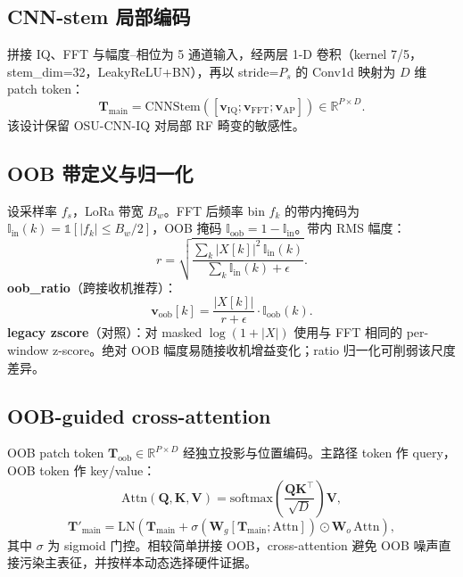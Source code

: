 \documentclass[journal]{IEEEtran}
\begin{document}
\subsection{CNN-stem 局部编码}
拼接 IQ、FFT 与幅度--相位为 5 通道输入，经两层 1-D 卷积（kernel 7/5，stem\_dim=32，LeakyReLU+BN），再以 stride=$P_s$ 的 Conv1d 映射为 $D$ 维 patch token：
\begin{equation}
  \mathbf{T}_{\mathrm{main}} = \mathrm{CNNStem}([\mathbf{v}_{\mathrm{IQ}};\mathbf{v}_{\mathrm{FFT}};\mathbf{v}_{\mathrm{AP}}]) \in \mathbb{R}^{P\times D}.
\end{equation}
该设计保留 OSU-CNN-IQ 对局部 RF 畸变的敏感性。

\subsection{OOB 带定义与归一化}
\label{sec:oob}
设采样率 $f_s$，LoRa 带宽 $B_w$。FFT 后频率 bin $f_k$ 的带内掩码为 $\mathbb{I}_{\mathrm{in}}(k)=\mathbb{1}[|f_k|\le B_w/2]$，OOB 掩码 $\mathbb{I}_{\mathrm{oob}}=1-\mathbb{I}_{\mathrm{in}}$。带内 RMS 幅度：
\begin{equation}
  r = \sqrt{\frac{\sum_k |X[k]|^2\,\mathbb{I}_{\mathrm{in}}(k)}{\sum_k \mathbb{I}_{\mathrm{in}}(k)+\epsilon}}.
\end{equation}
\textbf{oob\_ratio}（跨接收机推荐）：
\begin{equation}
  \mathbf{v}_{\mathrm{oob}}[k] = \frac{|X[k]|}{r+\epsilon}\cdot \mathbb{I}_{\mathrm{oob}}(k).
\end{equation}
\textbf{legacy zscore}（对照）：对 masked $\log(1+|X|)$ 使用与 FFT 相同的 per-window z-score。绝对 OOB 幅度易随接收机增益变化；ratio 归一化可削弱该尺度差异。

\subsection{OOB-guided cross-attention}
OOB patch token $\mathbf{T}_{\mathrm{oob}}\in\mathbb{R}^{P\times D}$ 经独立投影与位置编码。主路径 token 作 query，OOB token 作 key/value：
\begin{equation}
  \mathrm{Attn}(\mathbf{Q},\mathbf{K},\mathbf{V}) = \mathrm{softmax}\!\left(\frac{\mathbf{Q}\mathbf{K}^\top}{\sqrt{D}}\right)\mathbf{V},
\end{equation}
\begin{equation}
  \mathbf{T}'_{\mathrm{main}} = \mathrm{LN}\!\left(\mathbf{T}_{\mathrm{main}} + \sigma\!\left(\mathbf{W}_g[\mathbf{T}_{\mathrm{main}};\mathrm{Attn}]\right)\odot \mathbf{W}_o\,\mathrm{Attn}\right),
\end{equation}
其中 $\sigma$ 为 sigmoid 门控。相较简单拼接 OOB，cross-attention 避免 OOB 噪声直接污染主表征，并按样本动态选择硬件证据。
\end{document}
